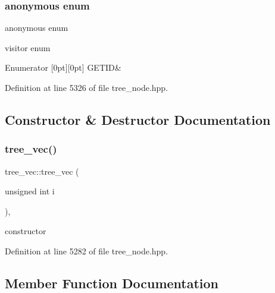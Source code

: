 \subsubsection{\texorpdfstring{anonymous enum}{anonymous enum}}
{\footnotesize\ttfamily anonymous enum}



visitor enum 

\begin{DoxyEnumFields}{Enumerator}
[0pt][0pt]{}\mbox{\label{structtree__vec_af85c857ad38740884cb1ffcf64f981eba1425466f563e52a09816b9e11fa14f0a}} 
G\+E\+T\+ID&\\
\hline

\end{DoxyEnumFields}


Definition at line 5326 of file tree\+\_\+node.\+hpp.



\subsection{Constructor \& Destructor Documentation}
\mbox{\label{structtree__vec_a401a3cb1ed09ac4ce6205ca73d331ca1}} 
\subsubsection{\texorpdfstring{tree\+\_\+vec()}{tree\_vec()}}
{\footnotesize\ttfamily tree\+\_\+vec\+::tree\+\_\+vec (\begin{DoxyParamCaption}\item[{unsigned int}]{i }\end{DoxyParamCaption})\hspace{0.3cm}{\ttfamily [inline]}, {\ttfamily [explicit]}}



constructor 



Definition at line 5282 of file tree\+\_\+node.\+hpp.



\subsection{Member Function Documentation}
\mbox{\label{structtree__vec_aa82f27505cd577c9c020a344cc5316bb}} 
